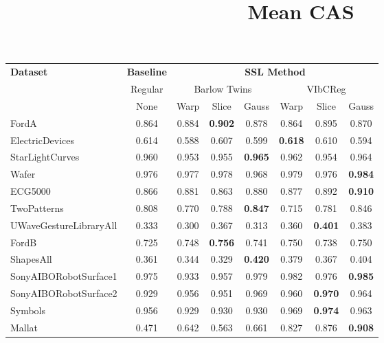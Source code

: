 \documentclass[../../thesis.tex]{subfiles}
\begin{document}
\begin{table}[H]
    \centering
    \title{Mean CAS}
    \begin{adjustbox}{width=\textwidth}
    \begin{tabular}{lc|c|c|c|c|c|c} %
        \toprule
        \multirow{3}{*}{\textbf{Dataset}} & \multicolumn{1}{c}{\textbf{Baseline}} & \multicolumn{6}{c}{\textbf{SSL Method}} \\
                                         \cmidrule(lr){3-8}
                                          & \multicolumn{1}{c}{Regular}           & \multicolumn{3}{c}{Barlow Twins}    &  \multicolumn{3}{c}{VIbCReg} \\
                                                                                   \cmidrule(lr){3-5}                    \cmidrule(lr){6-8}
                                          &   None                                & Warp  & Slice & Gauss               & Warp & Slice & Gauss \\
                            
        \midrule
        FordA                   & 0.864 & 0.884 & \textbf{0.902} & 0.878 & 0.864 & 0.895 & 0.870 \\
        ElectricDevices         & 0.614 & 0.588 & 0.607 & 0.599 & \textbf{0.618} & 0.610 & 0.594 \\
        StarLightCurves         & 0.960 & 0.953 & 0.955 & \textbf{0.965} & 0.962 & 0.954 & 0.964 \\
        Wafer                   & 0.976 & 0.977 & 0.978 & 0.968 & 0.979 & 0.976 & \textbf{0.984} \\
        ECG5000                 & 0.866 & 0.881 & 0.863 & 0.880 & 0.877 & 0.892 & \textbf{0.910} \\
        TwoPatterns             & 0.808 & 0.770 & 0.788 & \textbf{0.847} & 0.715 & 0.781 & 0.846 \\
        UWaveGestureLibraryAll  & 0.333 & 0.300 & 0.367 & 0.313 & 0.360 & \textbf{0.401} & 0.383 \\
        FordB                   & 0.725 & 0.748 & \textbf{0.756} & 0.741 & 0.750 & 0.738 & 0.750 \\
        ShapesAll               & 0.361 & 0.344 & 0.329 & \textbf{0.420 }& 0.379 & 0.367 & 0.404 \\
        SonyAIBORobotSurface1   & 0.975 & 0.933 & 0.957 & 0.979 & 0.982 & 0.976 & \textbf{0.985} \\
        SonyAIBORobotSurface2   & 0.929 & 0.956 & 0.951 & 0.969 & 0.960 & \textbf{0.970} & 0.964 \\
        Symbols                 & 0.956 & 0.929 & 0.930 & 0.930 & 0.969 & \textbf{0.974} & 0.963 \\
        Mallat                  & 0.471 & 0.642 & 0.563 & 0.661 & 0.827 & 0.876 & \textbf{0.908} \\
        \bottomrule
    \end{tabular}
    \end{adjustbox}
\end{table}
\end{document}
